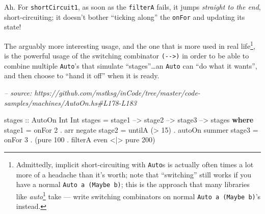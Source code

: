 \documentclass[]{article}
\newenvironment{Shaded}{}{}
\newcommand{\CommentTok}[1]{\textcolor[rgb]{0.38,0.63,0.69}{\textit{#1}}}
\newcommand{\DataTypeTok}[1]{\textcolor[rgb]{0.56,0.13,0.00}{#1}}
\newcommand{\DecValTok}[1]{\textcolor[rgb]{0.25,0.63,0.44}{#1}}
\newcommand{\FunctionTok}[1]{\textcolor[rgb]{0.02,0.16,0.49}{#1}}
\newcommand{\KeywordTok}[1]{\textcolor[rgb]{0.00,0.44,0.13}{\textbf{#1}}}
\newcommand{\NormalTok}[1]{#1}
\newcommand{\OtherTok}[1]{\textcolor[rgb]{0.00,0.44,0.13}{#1}}
\renewcommand{\href}[2]{#2\footnote{\url{#1}}}
\begin{document}
Ah. For \texttt{shortCircuit1}, as soon as the \texttt{filterA} fails, it jumps
\emph{straight to the end}, short-circuiting; it doesn't bother ``ticking
along'' the \texttt{onFor} and updating its state!

The arguably more interesting usage, and the one that is more used in real
life\footnote{Admittedly, implicit short-circuiting with \texttt{Auto}s is
  actually often times a lot more of a headache than it's worth; note that
  ``switching'' still works if you have a normal \texttt{Auto\ a\ (Maybe\ b)};
  this is the approach that many libraries like
  \href{https://github.com/mstksg/auto.}{\emph{auto}} take --- write switching
  combinators on normal \texttt{Auto\ a\ (Maybe\ b)}'s instead.}, is the
powerful usage of the switching combinator \texttt{(-\/-\textgreater{})} in
order to be able to combine multiple \texttt{Auto}'s that simulate
``stages''\ldots{}an \texttt{Auto} can ``do what it wants'', and then choose to
``hand it off'' when it is ready.

\begin{Shaded}
\begin{Highlighting}[]
\CommentTok{-- source: https://github.com/mstksg/inCode/tree/master/code-samples/machines/AutoOn.hs#L178-L183}

\OtherTok{stages ::} \DataTypeTok{AutoOn} \DataTypeTok{Int} \DataTypeTok{Int}
\NormalTok{stages }\FunctionTok{=}\NormalTok{ stage1 }\FunctionTok{-->}\NormalTok{ stage2 }\FunctionTok{-->}\NormalTok{ stage3 }\FunctionTok{-->}\NormalTok{ stages}
  \KeywordTok{where}
\NormalTok{    stage1 }\FunctionTok{=}\NormalTok{ onFor }\DecValTok{2} \FunctionTok{.}\NormalTok{ arr negate}
\NormalTok{    stage2 }\FunctionTok{=}\NormalTok{ untilA (}\FunctionTok{>} \DecValTok{15}\NormalTok{) }\FunctionTok{.}\NormalTok{ autoOn summer}
\NormalTok{    stage3 }\FunctionTok{=}\NormalTok{ onFor }\DecValTok{3} \FunctionTok{.}\NormalTok{ (pure }\DecValTok{100} \FunctionTok{.}\NormalTok{ filterA even }\FunctionTok{<|>}\NormalTok{ pure }\DecValTok{200}\NormalTok{)}
\end{Highlighting}
\end{Shaded}
\end{document}
